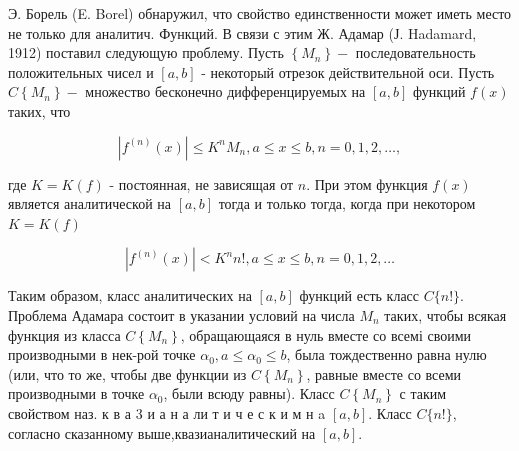 \documentclass[10pt]{article}
\begin{document}
Э. Борель (E. Borel) обнаружил, что свойство единственности может иметь место не только для аналитич. Функций. В связи с этим Ж. Адамар (Ј. Hadamard, 1912) поставил следующую проблему. Пусть $\left\{M_{n}\right\}-$ последовательность положительных чисел и $[a, b]$ - некоторый отрезок действительной оси. Пусть $C\left\{M_{n}\right\}-$ множество бесконечно дифференцируемых на $[a, b]$ функций $f(x)$ таких, что



\[

\left|f^{(n)}(x)\right| \leqslant K^{n} M_{n}, a \leqslant x \leqslant b, n=0,1,2, \ldots,

\]



где $K=K(f)$ - постоянная, не зависящая от $n$. При этом функция $f(x)$ является аналитической на $[a, b]$ тогда и только тогда, когда при некотором $K=K(f)$



\[

\left|f^{(n)}(x)\right|<K^{n} n !, a \leqslant x \leqslant b, n=0,1,2, \ldots

\]



Таким образом, класс аналитических на $[a, b]$ функций есть класс $C\{n !\}$. Проблема Адамара состоит в указании условий на числа $M_{n}$ таких, чтобы всякая функция из класса $C\left\{M_{n}\right\}$, обращающаяся в нуль вместе со всемі своими производными в нек-рой точке $\alpha_{0}, a \leqslant \alpha_{0} \leqslant b$, была тождественно равна нулю (или, что то же, чтобы две функции из $C\left\{M_{n}\right\}$, равные вместе со всеми производными в точке $\alpha_{0}$, были всюду равны). Класс $C\left\{M_{n}\right\}$ с таким свойством наз. к в а 3 и а н а ли т и ч е с к и м н a $[a, b]$. Класс $C\{n !\}$, согласно сказанному выше,квазианалитический на $[a, b]$.
\end{document}
